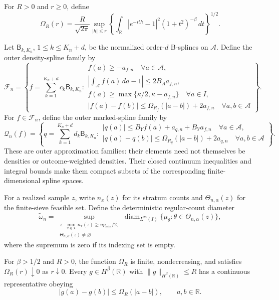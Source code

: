 For \(R>0\) and \(r\ge 0\), define
\[
 \Omega_R(r)=\frac{R}{\sqrt{2\pi}}
 \sup_{|h|\le r}
 \left\{\int_{\mathbb R}|e^{-ith}-1|^2(1+t^2)^{-\beta}\,dt\right\}^{1/2}.
\]

Let \(\mathsf B_{k,K_n}\), \(1\le k\le K_n+d\), be the normalized order-\(d\) B-splines on \(\mathcal A\). Define the outer density-spline family by
\[
 \mathscr F_n=\left\{f=\sum_{k=1}^{K_n+d}c_k\mathsf B_{k,K_n}:
 \begin{array}{l}
 f(a)\ge-a_{f,n}\quad\forall a\in\mathcal A,\\
 \left|\int_{\mathcal A}f(a)\,da-1\right|\le2B_Aa_{f,n},\\
 f(a)\ge\max\{\kappa/2,\kappa-a_{f,n}\}\quad\forall a\in I,\\
 |f(a)-f(b)|\le\Omega_{R_f}(|a-b|)+2a_{f,n}
 \quad\forall a,b\in\mathcal A
 \end{array}
 \right\}.
\]
For \(f\in\mathscr F_n\), define the outer marked-spline family by
\[
 \mathscr Q_n(f)=\left\{q=\sum_{k=1}^{K_n+d}d_k\mathsf B_{k,K_n}:
 \begin{array}{l}
 |q(a)|\le B_Yf(a)+a_{q,n}+B_Ya_{f,n}\quad\forall a\in\mathcal A,\\
 |q(a)-q(b)|\le\Omega_{R_q}(|a-b|)+2a_{q,n}
 \quad\forall a,b\in\mathcal A
 \end{array}
 \right\}.
\]
These are outer approximation families: their elements need not themselves be densities or outcome-weighted densities. Their closed continuum inequalities and integral bounds make them compact subsets of the corresponding finite-dimensional spline spaces.

For a realized sample \(z\), write \(n_x(z)\) for its stratum counts and \(\Theta_{n,\alpha}(z)\) for the finite-sieve feasible set. Define the deterministic regular-count diameter
\[
 \widetilde\omega_n=
 \sup_{\substack{z:\ \min_{x\in\mathcal X}n_x(z)\ge np_{\min}/2,\\
                  \Theta_{n,\alpha}(z)\ne\varnothing}}
 \operatorname{diam}_{L^\infty(I)}
 \{\mu_\theta:\theta\in\Theta_{n,\alpha}(z)\},
\]
where the supremum is zero if its indexing set is empty.

For \(\beta>1/2\) and \(R>0\), the function \(\Omega_R\) is finite, nondecreasing, and satisfies \(\Omega_R(r)\downarrow0\) as \(r\downarrow0\). Every \(g\in H^\beta(\mathbb R)\) with \(\|g\|_{H^\beta(\mathbb R)}\le R\) has a continuous representative obeying
\[
 |g(a)-g(b)|\le\Omega_R(|a-b|),\qquad a,b\in\mathbb R.
\]

